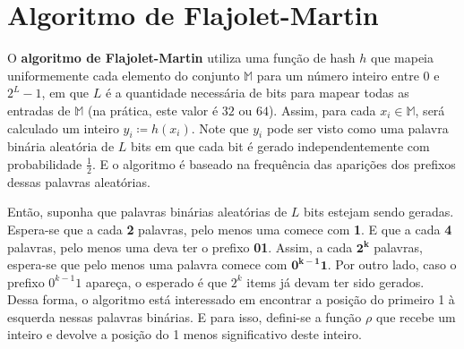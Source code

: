 \section{Algoritmo de Flajolet-Martin}

O \textbf{algoritmo de Flajolet-Martin} utiliza uma função de hash $h$ que mapeia uniformemente cada elemento do conjunto $\mathbb{M}$
para um número inteiro entre $0$ e $2^L-1$, em que $L$ é a quantidade necessária de bits para mapear todas as entradas de $\mathbb{M}$
(na prática, este valor é $32$ ou $64$).
Assim, para cada $x_i \in \mathbb{M}$, será calculado um inteiro $y_i \coloneqq h(x_i)$. Note que $y_i$ pode ser visto como 
uma palavra binária aleatória de $L$ bits em que cada bit é gerado independentemente com probabilidade $\frac{1}{2}$.
E o algoritmo é baseado na frequência das aparições dos prefixos dessas palavras aleatórias.

Então, suponha que palavras binárias aleatórias de $L$ bits estejam sendo geradas. Espera-se que a cada \textbf{2} palavras, pelo menos uma comece
com \textbf{1}. E que a cada \textbf{4} palavras, pelo menos uma deva ter o prefixo \textbf{01}. Assim, a cada $\mathbf{2^k}$ palavras, espera-se
que pelo menos uma palavra comece com $\mathbf{0^{k-1}1}$. Por outro lado, caso o prefixo $0^{k-1}1$ apareça, o esperado é que $2^{k}$ 
items já devam ter sido gerados. Dessa forma, o algoritmo está interessado em encontrar a posição do primeiro 1 à esquerda nessas palavras binárias.
E para isso, defini-se a função $\rho$ que recebe um inteiro e devolve a posição do 1 menos significativo deste inteiro.
